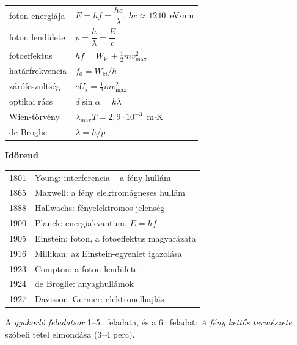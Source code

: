 \documentclass[12pt]{article}
\begin{document}
\begin{minipage}[t]{0.50\linewidth}\vspace{0pt}
\begin{fontos}[title=Képletek,fonttitle=\bfseries]
\renewcommand{\arraystretch}{1.5}
\begin{tabular}{@{}ll@{}}
foton energiája & $E = hf = \dfrac{hc}{\lambda}$, \; $hc \approx 1240$~eV$\cdot$nm \\
foton lendülete & $p = \dfrac{h}{\lambda} = \dfrac{E}{c}$ \\
fotoeffektus & $hf = W_\text{ki} + \tfrac12 mv_\text{max}^2$ \\
határfrekvencia & $f_0 = W_\text{ki}/h$ \\
zárófeszültség & $eU_\text{z} = \tfrac12 mv_\text{max}^2$ \\
optikai rács & $d\sin\alpha = k\lambda$ \\
Wien-törvény & $\lambda_\text{max}T = 2{,}9\cdot 10^{-3}$~m$\cdot$K \\
de Broglie & $\lambda = h/p$ \\
\end{tabular}
\end{fontos}
\end{minipage}\hfill
\begin{minipage}[t]{0.47\linewidth}\vspace{0pt}
\textbf{Időrend}

\renewcommand{\arraystretch}{1.25}
\begin{tabular}{@{}r@{\quad}l@{}}
1801 & Young: interferencia -- a fény hullám \\
1865 & Maxwell: a fény elektromágneses hullám \\
1888 & Hallwachs: fényelektromos jelenség \\
1900 & Planck: energiakvantum, $E = hf$ \\
1905 & Einstein: foton, a fotoeffektus magyarázata \\
1916 & Millikan: az Einstein-egyenlet igazolása \\
1923 & Compton: a foton lendülete \\
1924 & de Broglie: anyaghullámok \\
1927 & Davisson--Germer: elektronelhajlás \\
\end{tabular}

\vspace{10pt}
\begin{fontos}[colback=yellow!8,colframe=orange!70!black,title=Házi feladat,fonttitle=\bfseries]
A \emph{gyakorló feladatsor} 1--5.\ feladata, és a 6.\ feladat: \emph{A fény kettős
természete} szóbeli tétel elmondása (3--4 perc).
\end{fontos}
\end{minipage}
\end{document}
